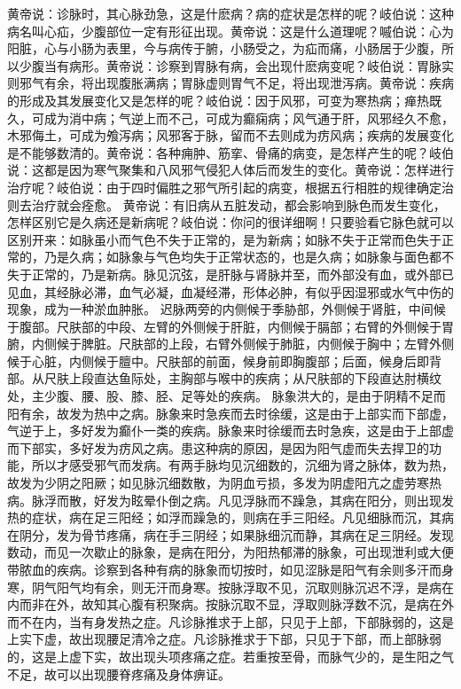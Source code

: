 \documentclass[a4paper,12pt,UTF8,twoside]{ctexbook}
\begin{document}
黄帝说：诊脉时，其心脉劲急，这是什麽病？病的症状是怎样的呢？岐伯说：这种病名叫心疝，少腹部位一定有形征出现。黄帝说：这是什么道理呢？嘁伯说：心为阳脏，心与小肠为表里，今与病传于腑，小肠受之，为疝而痛，小肠居于少腹，所以少腹当有病形。黄帝说：诊察到胃脉有病，会出现什麽病变呢？岐伯说：胃脉实则邪气有余，将出现腹胀满病；胃脉虚则胃气不足，将出现泄泻病。黄帝说：疾病的形成及其发展变化又是怎样的呢？岐伯说：因于风邪，可变为寒热病；瘅热既久，可成为消中病；气逆上而不己，可成为癫痫病；风气通于肝，风邪经久不愈，木邪侮土，可成为飧泻病；风邪客于脉，留而不去则成为疠风病；疾病的发展变化是不能够数清的。黄帝说：各种痈肿、筋挛、骨痛的病变，是怎样产生的呢？岐伯说：这都是因为寒气聚集和八风邪气侵犯人体后而发生的变化。黄帝说：怎样进行治疗呢？岐伯说：由于四时偏胜之邪气所引起的病变，根据五行相胜的规律确定治则去治疗就会痊愈。
黄帝说：有旧病从五脏发动，都会影响到脉色而发生变化，怎样区别它是久病还是新病呢？岐伯说：你问的很详细啊！只要验看它脉色就可以区别开来：如脉虽小而气色不失于正常的，是为新病；如脉不失于正常而色失于正常的，乃是久病；如脉象与气色均失于正常状态的，也是久病；如脉象与面色都不失于正常的，乃是新病。脉见沉弦，是肝脉与肾脉并至，而外部没有血，或外部已见血，其经脉必滞，血气必凝，血凝经滞，形体必肿，有似乎因湿邪或水气中伤的现象，成为一种淤血肿胀。
迟脉两旁的内侧候于季胁部，外侧候于肾脏，中间候于腹部。尺肤部的中段、左臂的外侧候于肝脏，内侧候于膈部；右臂的外侧候于胃腑，内侧候于脾脏。尺肤部的上段，右臂外侧候于肺脏，内侧候于胸中；左臂外侧候于心脏，内侧候于膻中。尺肤部的前面，候身前即胸腹部；后面，候身后即背部。从尺肤上段直达鱼际处，主胸部与喉中的疾病；从尺肤部的下段直达肘横纹处，主少腹、腰、股、膝、胫、足等处的疾病。
脉象洪大的，是由于阴精不足而阳有余，故发为热中之病。脉象来时急疾而去时徐缓，这是由于上部实而下部虚，气逆于上，多好发为癫仆一类的疾病。脉象来时徐缓而去时急疾，这是由于上部虚而下部实，多好发为疠风之病。患这种病的原因，是因为阳气虚而失去捍卫的功能，所以才感受邪气而发病。有两手脉均见沉细数的，沉细为肾之脉体，数为热，故发为少阴之阳厥；如见脉沉细数散，为阴血亏损，多发为阴虚阳亢之虚劳寒热病。脉浮而散，好发为眩晕仆倒之病。凡见浮脉而不躁急，其病在阳分，则出现发热的症状，病在足三阳经；如浮而躁急的，则病在手三阳经。凡见细脉而沉，其病在阴分，发为骨节疼痛，病在手三阴经；如果脉细沉而静，其病在足三阴经。发现数动，而见一次歇止的脉象，是病在阳分，为阳热郁滞的脉象，可出现泄利或大便带脓血的疾病。诊察到各种有病的脉象而切按时，如见涩脉是阳气有余则多汗而身寒，阴气阳气均有余，则无汗而身寒。按脉浮取不见，沉取则脉沉迟不浮，是病在内而非在外，故知其心腹有积聚病。按脉沉取不显，浮取则脉浮数不沉，是病在外而不在内，当有身发热之症。凡诊脉推求于上部，只见于上部，下部脉弱的，这是上实下虚，故出现腰足清冷之症。凡诊脉推求于下部，只见于下部，而上部脉弱的，这是上虚下实，故出现头项疼痛之症。若重按至骨，而脉气少的，是生阳之气不足，故可以出现腰脊疼痛及身体痹证。
\end{document}
